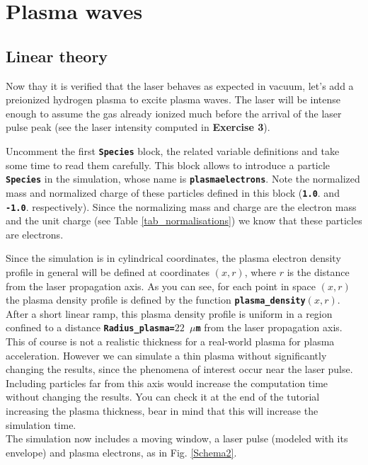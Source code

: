 \documentclass{article}
\newcommand{\commandline}[1]{\texttt{\textbf{#1}}}
\begin{document}
\section{Plasma waves}

\subsection {Linear theory}
Now thay it is verified that the laser behaves as expected in vacuum, let's add a preionized hydrogen plasma to excite plasma waves.
The laser will be intense enough to assume the gas already ionized much before the arrival of the laser pulse peak (see the laser intensity computed in \textbf{Exercise 3}).

Uncomment the first \commandline{Species} block, the related variable definitions and take some time to read them carefully. This block allows to introduce a particle \commandline{Species} in the simulation, whose name is \commandline{plasmaelectrons}. Note the normalized mass and normalized charge of these particles defined in this block (\commandline{1.0}. and \commandline{-1.0}. respectively). Since the normalizing mass and charge are the electron mass and the unit charge (see Table \ref{tab_normalisations}) we know that these particles are electrons.

Since the simulation is in cylindrical coordinates, the plasma electron density profile in general will be defined at coordinates $(x,r)$, where $r$ is the distance from the laser propagation axis. As you can see, for each point in space $(x,r)$ the plasma density profile is defined by the function \commandline{plasma\_density$(x,r)$}. After a short linear ramp, this plasma density profile is uniform in a region confined to a distance \commandline{Radius\_plasma=$22$ $\mu$m} from the laser propagation axis. This of course is not a realistic thickness for a real-world plasma for plasma acceleration. However we can simulate a thin plasma without significantly changing the results, since the phenomena of interest occur near the laser pulse. Including particles far from this axis would increase the computation time without changing the results. You can check it at the end of the tutorial increasing the plasma thickness, bear in mind that this will increase the  simulation time.\\

The simulation now includes a moving window, a laser pulse (modeled with its envelope) and plasma electrons, as in Fig. \ref{Schema2}.
\end{document}
